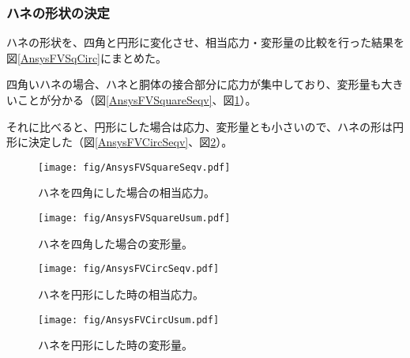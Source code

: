 \documentclass[11pt]{jreport}
\newcommand{\figref}[1]{図\ref{#1}}
\begin{document}
\newpage
\subsubsection{ハネの形状の決定}
ハネの形状を、四角と円形に変化させ、相当応力・変形量の比較を行った結果を\figref{AnsysFVSqCirc}にまとめた。

四角いハネの場合、ハネと胴体の接合部分に応力が集中しており、変形量も大きいことが分かる（\figref{AnsysFVSquareSeqv}、\figref{AnsysFVSquareUsum}）。

それに比べると、円形にした場合は応力、変形量とも小さいので、ハネの形は円形に決定した（\figref{AnsysFVCircSeqv}、\figref{AnsysFVCircUsum}）。

\begin{figure}[htbp]
\begin{minipage}{0.47\textwidth}
\centering
\texttt{[image: fig/AnsysFVSquareSeqv.pdf]}
\caption[ハネを四角にした場合の相当応力]{ハネを四角にした場合の相当応力。}
\label{AnsysFVSquareSeqv}
\end{minipage}
\hfill
\begin{minipage}{0.47\textwidth}
\centering
\texttt{[image: fig/AnsysFVSquareUsum.pdf]}
\caption[ハネを四角にした場合の変形量]{ハネを四角した場合の変形量。}
\label{AnsysFVSquareUsum}
\end{minipage}
\end{figure}

\begin{figure}[htbp]
\begin{minipage}{0.47\textwidth}
\centering
\texttt{[image: fig/AnsysFVCircSeqv.pdf]}
\caption[ハネを円形にした時の相当応力]{ハネを円形にした時の相当応力。}
\label{AnsysFVCircSeqv}
\end{minipage}
\hfill
\begin{minipage}{0.47\textwidth}
\centering
\texttt{[image: fig/AnsysFVCircUsum.pdf]}
\caption[ハネを円形にした時の変形量]{ハネを円形にした時の変形量。}
\label{AnsysFVCircUsum}
\end{minipage}
\end{figure}
\fi%
\end{document}
